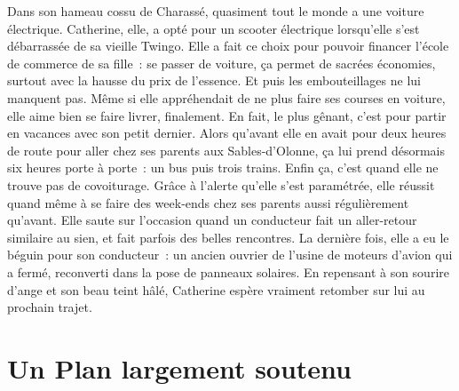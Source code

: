 \documentclass[a5paper,french,openany]{memoir}
\begin{document}
Dans son hameau cossu de Charassé, quasiment tout le monde a une voiture électrique. Catherine, elle, a opté pour un scooter électrique lorsqu'elle s'est débarrassée de sa vieille Twingo. Elle a fait ce choix pour pouvoir financer l'école de commerce de sa fille~: se passer de voiture, ça permet de sacrées économies, surtout avec la hausse du prix de l'essence. Et puis les embouteillages ne lui manquent pas. Même si elle appréhendait de ne plus faire ses courses en voiture, elle aime bien se faire livrer, finalement. En fait, le plus gênant, c'est pour partir en vacances avec son petit dernier. Alors qu'avant elle en avait pour deux heures de route pour aller chez ses parents aux Sables-d'Olonne, ça lui prend désormais six heures porte à porte~: un bus puis trois trains. Enfin ça, c'est quand elle ne trouve pas de covoiturage. Grâce à l'alerte qu'elle s'est paramétrée, elle réussit quand même à se faire des week-ends chez ses parents aussi régulièrement qu'avant. Elle saute sur l'occasion quand un conducteur fait un aller-retour similaire au sien, et fait parfois des belles rencontres. La dernière fois, elle a eu le béguin pour son conducteur~: un ancien ouvrier de l'usine de moteurs d'avion qui a fermé, reconverti dans la pose de panneaux solaires. En repensant à son sourire d'ange et son beau teint hâlé, Catherine espère vraiment retomber sur lui au prochain trajet.


\chapter{Un Plan largement soutenu\label{ch:soutien}}
\end{document}
